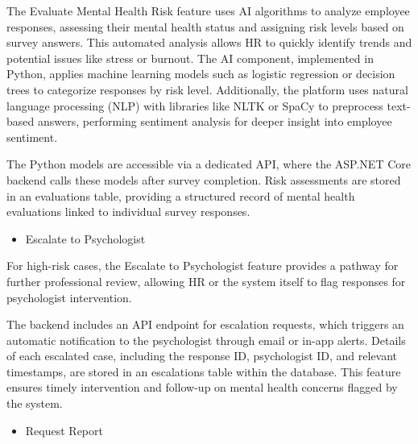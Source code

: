 \documentclass[conference]{IEEEtran}
\begin{document}
            The Evaluate Mental Health Risk feature uses AI algorithms to 
            analyze employee responses, assessing their mental health status and assigning risk levels based on survey answers. This automated analysis allows HR to quickly identify trends and potential issues like stress or burnout. The AI component, implemented in Python, applies machine learning models such as logistic regression or decision trees to categorize responses by risk level. Additionally, the platform uses natural language processing (NLP) with libraries like NLTK or SpaCy to preprocess text-based answers, performing sentiment analysis for deeper insight into employee sentiment. \newline
             
            The Python models are accessible via a dedicated API, where the ASP.NET Core backend calls these models after survey completion. Risk assessments are stored in an evaluations table, providing a structured record of mental health evaluations linked to individual survey responses.
            \newline    

            \begin{itemize}
                \item Escalate to Psychologist
            \end{itemize}
    
            For high-risk cases, the Escalate to Psychologist feature 
            provides a pathway for further professional review, allowing 
            HR or the system itself to flag responses for psychologist 
            intervention.
            \newline
    
            The backend includes an API endpoint 
            for escalation requests, which triggers an automatic 
            notification to the psychologist through email or in-app 
            alerts. Details of each escalated case, including the response
            ID, psychologist ID, and relevant timestamps, are stored in an
            escalations table within the database. This feature ensures 
            timely intervention and follow-up on mental health concerns
            flagged by the system.
            \newline    

            \begin{itemize}
                \item Request Report
            \end{itemize}
    
\end{document}
